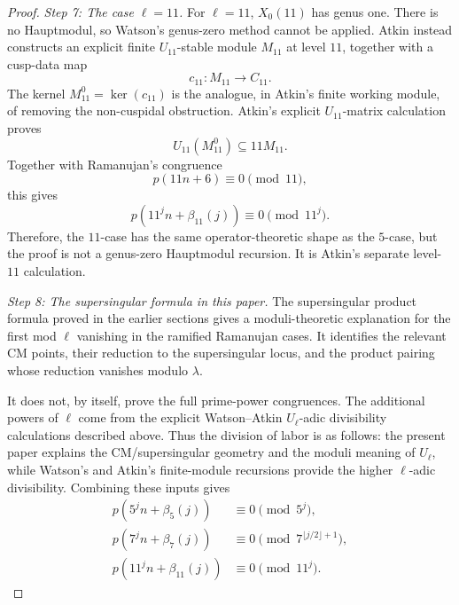 \documentclass[12pt]{amsart}
\theoremstyle{definition}
\theoremstyle{remark}
\begin{document}
\begin{proof}
\smallskip
\noindent
\emph{Step 7: The case \(\ell=11\).}
For \(\ell=11\), \(X_0(11)\) has genus one.  There is no Hauptmodul, so
Watson's genus-zero method cannot be applied.  Atkin instead constructs
an explicit finite \(U_{11}\)-stable module \(M_{11}\) at level \(11\),
together with a cusp-data map
\[
        c_{11}:M_{11}\longrightarrow C_{11}.
\]
The kernel \(M_{11}^0=\ker(c_{11})\) is the analogue, in Atkin's finite
working module, of removing the non-cuspidal obstruction.  Atkin's
explicit \(U_{11}\)-matrix calculation proves
\[
        U_{11}(M_{11}^0)\subseteq 11M_{11}.
\]
Together with Ramanujan's congruence
\[
        p(11n+6)\equiv0\pmod {11},
\]
this gives
\[
        p(11^j n+\beta_{11}(j))\equiv0\pmod {11^j}.
\]
Therefore, the \(11\)-case has the same operator-theoretic shape as the
\(5\)-case, but the proof is not a genus-zero Hauptmodul recursion.  It
is Atkin's separate level-\(11\) calculation.

\smallskip
\noindent
\emph{Step 8: The supersingular formula in this paper.}
The supersingular product formula proved in the earlier sections gives a
moduli-theoretic explanation for the first mod \(\ell\) vanishing in the
ramified Ramanujan cases.  It identifies the relevant CM points, their
reduction to the supersingular locus, and the product pairing whose
reduction vanishes modulo \(\lambda\).

It does not, by itself, prove the full prime-power congruences.  The
additional powers of \(\ell\) come from the explicit Watson--Atkin
\(U_\ell\)-adic divisibility calculations described above.  Thus the
division of labor is as follows: the present paper explains the
CM/supersingular geometry and the moduli meaning of \(U_\ell\), while
Watson's and Atkin's finite-module recursions provide the higher
\(\ell\)-adic divisibility.  Combining these inputs gives
\[
\begin{split}
p(5^{j}n+\beta_5(j))&\equiv0\pmod {5^{j}},\\
p(7^{j}n+\beta_7(j))&\equiv0\pmod {7^{\lfloor j/2\rfloor+1}},\\
p(11^{j}n+\beta_{11}(j))&\equiv0\pmod {11^{j}}.
\end{split}
\]
\end{proof}
\end{document}
